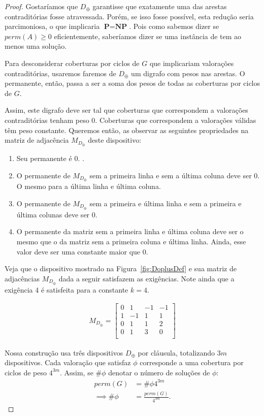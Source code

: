 \documentclass[paper=a4, fontsize=11pt]{scrartcl} %
\numberwithin{equation}{subsection}
\numberwithin{figure}{subsection}
\numberwithin{table}{subsection}
\numberwithin{definition}{subsection}
\numberwithin{theorem}{subsection}
\numberwithin{property}{subsection}
\numberwithin{proposition}{subsection}
\newcommand{\perm}{perm}
\renewcommand{\P}{\textbf{P}\xspace}
\newcommand{\NP}{\textbf{NP}\xspace}
\newcommand{\prob}[1]{\text{\textsc{\textbf{#1}}}}
\begin{document}
\begin{proof}
Gostaríamos que $D_\oplus$ garantisse que exatamente uma das arestas contraditórias fosse atravessada. Porém, se isso fosse possível, esta redução seria parcimoniosa, o que implicaria $ \P = \NP$. Pois como sabemos dizer se $ \perm(A) \geq 0 $ eficientemente, saberíamos dizer se uma instância de \prob{3sat} tem ao menos uma solução.

Para desconsiderar coberturas por ciclos de $G$ que implicariam valorações contraditórias, usaremos faremos de $D_\oplus$ um digrafo com pesos nas arestas. O permanente, então, passa a ser a soma dos pesos de todas as coberturas por ciclos de $G$. 

Assim, este digrafo deve ser tal que coberturas que correspondem a valorações contraditórias tenham peso 0. Coberturas que correspondem a valorações válidas têm peso constante. Queremos então, as observar as seguintes propriedades na matriz de adjacência $M_{D_\oplus}$ deste dispositivo:

\begin{enumerate}
  \item Seu permanente é 0. .
  \item O permanente de $M_{D_\oplus}$ sem a primeira linha e sem a última coluna deve ser 0. O mesmo para a última linha e última coluna.
  \item O permanente de $M_{D_\oplus}$ sem a primeira e última linha e sem a primeira e última colunas deve ser 0.
  \item O permanente da matriz sem a primeira linha e última coluna deve ser o mesmo que o da matriz sem a primeira coluna e última linha. Ainda, esse valor deve ser uma constante maior que 0.
\end{enumerate}

Veja que o dispositivo mostrado na Figura~\ref{fig:DoplusDef} e sua matriz de adjacências $ M_{D_\oplus} $ dada a seguir satisfazem as exigências. Note ainda que a exigência 4 é satisfeita para a constante $k = 4$.

\begin{align*}
M_{D_\oplus} = 
\begin{bmatrix}
0 &  1 & -1 & -1  \\
1 & -1 &  1 &  1  \\
0 &  1 &  1 &  2  \\
0 &  1 &  3 &  0  \\
\end{bmatrix}
\end{align*}

Nossa construção usa três dispositivos $D_\oplus$ por cláusula, totalizando $3m$ dispositivos. Cada valoração que satisfaz $\phi$ corresponde a uma cobertura por ciclos de peso $4^{3m}$. Assim, se $\#\phi$ denotar o número de soluções de $\phi$:
\begin{align*}
\perm(G) &= \#\phi4^{3m} \\
\implies \#\phi &= \frac{\perm(G)}{4^{3m}}.
\end{align*}
 

\end{proof}
\end{document}
